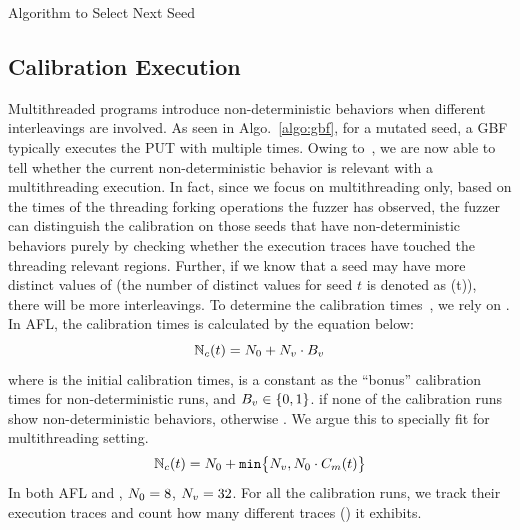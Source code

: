 \begin{algorithm}[t]
  \caption{Algorithm to Select Next Seed}\label{algo:select_seed}
\end{algorithm}







\subsection{Calibration Execution}\label{sec:calibrate}
Multithreaded programs introduce non-deterministic behaviors when different interleavings are involved.
As seen in Algo.~\ref{algo:gbf}, for a mutated seed, a GBF typically executes the PUT with multiple times. 
Owing to~\rtifunc, we are now able to tell whether the current non-deterministic behavior is relevant with a multithreading execution. In fact, since we focus on multithreading only, based on the times of the threading forking operations the fuzzer has observed, the fuzzer can distinguish the calibration on those seeds that have non-deterministic behaviors purely by checking whether the execution traces have touched the threading relevant regions. Further, if we know that a seed may have more distinct values of \tctxSign (the number of distinct values for seed $t$ is denoted as \Nmt(t)), there will be more interleavings. To determine the calibration times~\Ncal, we rely on \Nmt. In AFL, the calibration times is calculated by the equation below:
\begin{equation}
    \mathbb{N}_{c}(t) = N_0 + N_v\cdot B_v \label{eq:afl_cal}
\end{equation}
where \NcalO is the initial calibration times, \NcalV is a constant as the ``bonus'' calibration times for non-deterministic runs, and $B_v\in\{0,1\}$.  if none of the \NcalO calibration runs show non-deterministic behaviors, otherwise . We argue this to specially fit for multithreading setting. 
\begin{equation}
    \mathbb{N}_{c}(t) = N_0 + \texttt{min}\big\{N_v, N_0\cdot C_{m}(t)\big\}
\end{equation}
In both AFL and \mtfuzz, $N_0=8$, $N_v=32$.
For all the \Ncal calibration runs, we track their execution traces and count how many different traces (\NcalTrace) it exhibits. 


